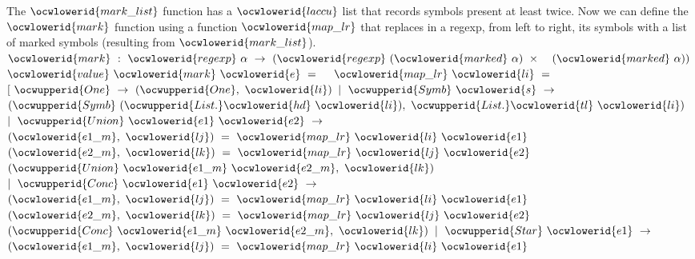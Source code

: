\documentclass[12pt]{article}
\begin{document}
\ocwendcode{}\ocwindent{0.00em}
The \ocwbegindcode{}$\ocwlowerid{mark\_list}$\ocwenddcode{} function has a \ocwbegindcode{}$\ocwlowerid{laccu}$\ocwenddcode{} list that records symbols present at 
   least twice. 
\ocweol
\ocwindent{0.00em}
Now we can define the \ocwbegindcode{}$\ocwlowerid{mark}$\ocwenddcode{} function using a function \ocwbegindcode{}$\ocwlowerid{map\_lr}$\ocwenddcode{}
   that replaces in a regexp, from left to right, its symbols with
    a list of marked symbols (resulting from \ocwbegindcode{}$\ocwlowerid{mark\_list}$\ocwenddcode{}). 
\ocweol
\ocwindent{0.00em}
\ocwbegindcode{}$\ocwlowerid{mark}~:~\ocwlowerid{regexp}~\alpha{}~\rightarrow{}~(\ocwlowerid{regexp}~(\ocwlowerid{marked}~\alpha{})~\times{}~$~$(\ocwlowerid{marked}~\alpha{}))$\ocwenddcode{}   
\ocweol
\label{../ML/regular.ml:5366}%
\medskip
\ocwbegincode{}\ocwindent{0.00em}
$\ocwlowerid{value}~\ocwlowerid{mark}~\ocwlowerid{e}~=$\ocweol
\ocwindent{1.00em}
~~$\ocwlowerid{map\_lr}~\ocwlowerid{li}~=~$\ocweol
\ocwindent{2.00em}
$[~\ocwupperid{One}~\rightarrow{}~(\ocwupperid{One},~\ocwlowerid{li})$\ocweol
\ocwindent{2.00em}
$\mid{}~\ocwupperid{Symb}~\ocwlowerid{s}~\rightarrow{}$\ocweol
\ocwindent{4.00em}
$(\ocwupperid{Symb}~(\ocwupperid{List.}\ocwlowerid{hd}~\ocwlowerid{li}),~\ocwupperid{List.}\ocwlowerid{tl}~\ocwlowerid{li})$\ocweol
\ocwindent{2.00em}
$\mid{}~\ocwupperid{Union}~\ocwlowerid{e1}~\ocwlowerid{e2}~\rightarrow{}$\ocweol
\ocwindent{4.00em}
~$(\ocwlowerid{e1\_m},~\ocwlowerid{lj})~=~\ocwlowerid{map\_lr}~\ocwlowerid{li}~\ocwlowerid{e1}~$\ocweol
\ocwindent{4.00em}
~$(\ocwlowerid{e2\_m},~\ocwlowerid{lk})~=~\ocwlowerid{map\_lr}~\ocwlowerid{lj}~\ocwlowerid{e2}~$\ocweol
\ocwindent{4.00em}
$(\ocwupperid{Union}~\ocwlowerid{e1\_m}~\ocwlowerid{e2\_m},~\ocwlowerid{lk})$\ocweol
\ocwindent{2.00em}
$\mid{}~\ocwupperid{Conc}~\ocwlowerid{e1}~\ocwlowerid{e2}~\rightarrow{}~$\ocweol
\ocwindent{4.00em}
~$(\ocwlowerid{e1\_m},~\ocwlowerid{lj})~=~\ocwlowerid{map\_lr}~\ocwlowerid{li}~\ocwlowerid{e1}~$\ocweol
\ocwindent{4.00em}
~$(\ocwlowerid{e2\_m},~\ocwlowerid{lk})~=~\ocwlowerid{map\_lr}~\ocwlowerid{lj}~\ocwlowerid{e2}~$\ocweol
\ocwindent{4.00em}
$(\ocwupperid{Conc}~\ocwlowerid{e1\_m}~\ocwlowerid{e2\_m},~\ocwlowerid{lk})$\ocweol
\ocwindent{2.00em}
$\mid{}~\ocwupperid{Star}~\ocwlowerid{e1}~\rightarrow{}~$\ocweol
\ocwindent{4.00em}
~$(\ocwlowerid{e1\_m},~\ocwlowerid{lj})~=~\ocwlowerid{map\_lr}~\ocwlowerid{li}~\ocwlowerid{e1}~$\ocweol
\ocwindent{4.00em}
\end{document}
